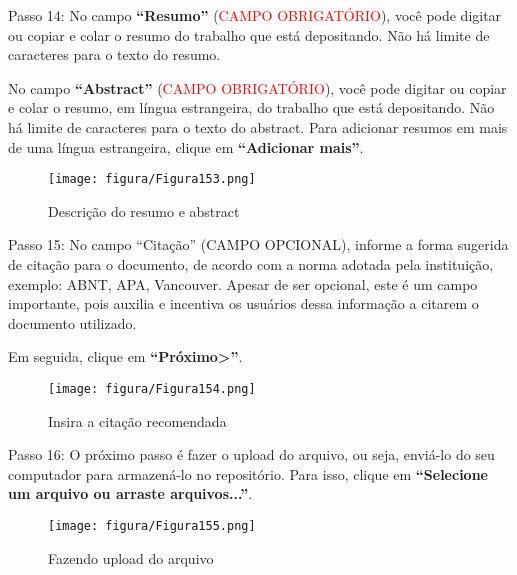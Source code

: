 \documentclass[12pt,hidelinks]{article}
\begin{document}
    Passo 14: No campo \textbf{“Resumo”} (\textcolor{red}{CAMPO OBRIGATÓRIO}), você pode digitar ou copiar e colar o resumo do trabalho que está depositando. Não há limite de caracteres para o texto do resumo.
    
    \singlespacing
    
    No campo \textbf{“Abstract”} (\textcolor{red}{CAMPO OBRIGATÓRIO}), você pode digitar ou copiar e colar o resumo, em língua estrangeira, do trabalho que está depositando. Não há limite de caracteres para o texto do abstract. Para adicionar resumos em mais de uma língua estrangeira, clique em \textbf{“Adicionar mais”}.
    
    \begin{figure}[!htp]
                \centering
                \texttt{[image: figura/Figura153.png]}
                \caption{Descrição do resumo e abstract}
            \label{Rotulo}
        \end{figure}
    
    \singlespacing
    
    Passo 15: No campo “Citação” (CAMPO OPCIONAL), informe a forma sugerida de citação para o documento, de acordo com a norma adotada pela instituição, exemplo: ABNT, APA, Vancouver. Apesar de ser opcional, este é um campo importante, pois auxilia e incentiva os usuários dessa informação a citarem o documento utilizado.
    
\newpage
    
    Em seguida, clique em \textbf{“Próximo>”}.
    
    \begin{figure}[!htp]
                \centering
                \texttt{[image: figura/Figura154.png]}
                \caption{Insira a citação recomendada}
            \label{Rotulo}
        \end{figure}
    
    Passo 16: O próximo passo é fazer o upload do arquivo, ou seja, enviá-lo do seu computador para armazená-lo no repositório. Para isso, clique em \textbf{“Selecione um arquivo ou arraste arquivos...”}.
    
    \begin{figure}[!htp]
                \centering
                \texttt{[image: figura/Figura155.png]}
                \caption{Fazendo upload do arquivo}
            \label{Rotulo}
        \end{figure}

\newpage
    
\end{document}
